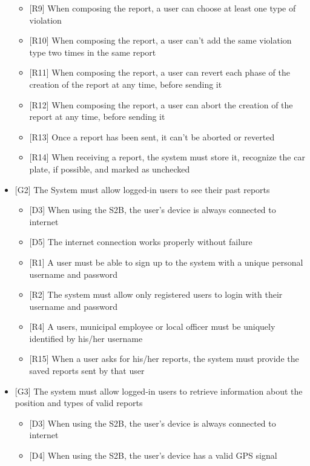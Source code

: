 \begin{itemize}
\begin{itemize}
								\item {[R9]} When composing the report, a user can choose at least one type of violation
								\item {[R10]} When composing the report, a user can't add the same violation type two times in the same report
								\item {[R11]} When composing the report, a user can revert each phase of the creation of the report at any time, before sending it
								\item {[R12]} When composing the report, a user can abort the creation of the report at any time, before sending it
								\item {[R13]} Once a report has been sent, it can't be aborted or reverted
								\item {[R14]} When receiving a report, the system must store it, recognize the car plate, if possible, and marked as unchecked
							\end{itemize}
						\clearpage
						\item {[G2]} The System must allow logged-in users to see their past reports
							\begin{itemize}
								\item {[D3]} When using the S2B, the user's device is always connected to internet
								\item {[D5]} The internet connection works properly without failure
								\item {[R1]} A user must be able to sign up to the system with a unique personal username and password
								\item {[R2]} The system must allow only registered users to login with their username and password
								\item {[R4]} A users, municipal employee or local officer must be uniquely identified by his/her username
								\item {[R15]} When a user asks for his/her reports, the system must provide the saved reports sent by that user
							\end{itemize}
						\item {[G3]} The system must allow logged-in users to retrieve information about the position and types of valid reports
							\begin{itemize}
								\item {[D3]} When using the S2B, the user's device is always connected to internet
								\item {[D4]} When using the S2B, the user's device has a valid GPS signal

\end{itemize}
\end{itemize}
